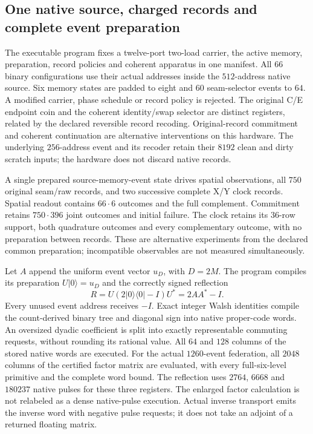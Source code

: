 \subsection{One native source, charged records and complete event preparation}
\label{sec:native-shared-source-field}

The executable program fixes a twelve-port two-load carrier, the active
memory, preparation, record policies and coherent apparatus in one manifest.
All $66$ binary configurations use their actual addresses inside the
$512$-address native source. Six memory states are padded to eight and
$60$ seam-selector events to $64$. A modified carrier, phase schedule or
record policy is rejected. The original C/E endpoint coin and the coherent
identity/swap selector are distinct registers, related by the declared
reversible record recoding. Original-record commitment and coherent
continuation are alternative interventions on this hardware. The underlying
$256$-address event and its recoder retain their $8192$ clean and dirty
scratch inputs; the hardware does not discard native records.

A single prepared source-memory-event state drives spatial observations,
all $750$ original seam/raw records, and two successive complete X/Y clock
records. Spatial readout contains $66\cdot6$ outcomes and the full
complement. Commitment retains $750\cdot396$ joint outcomes and initial
failure. The clock retains its $36$-row support, both quadrature outcomes
and every complementary outcome, with no preparation between records.
These are alternative experiments from the declared common preparation;
incompatible observables are not measured simultaneously.

Let $A$ append the uniform event vector $u_D$, with $D=2M$. The program
compiles its preparation $U|0\rangle=u_D$ and the correctly signed reflection
\[
 R=U(2|0\rangle\langle0|-I)U^*=2AA^*-I.
\]
Every unused event address receives $-I$. Exact integer Walsh identities
compile the count-derived binary tree and diagonal sign into native
proper-code words. An oversized dyadic coefficient is split into exactly
representable commuting requests, without rounding its rational value.
All $64$ and $128$ columns of the stored native words are executed.
For the actual $1260$-event federation, all $2048$ columns of the certified
factor matrix are evaluated, with every full-six-level primitive and the
complete word bound. The reflection uses $2764$, $6668$ and $180237$ native
pulses for these three registers. The enlarged factor calculation is not
relabeled as a dense native-pulse execution. Actual inverse transport emits
the inverse word with negative pulse requests; it does not take an adjoint
of a returned floating matrix.

